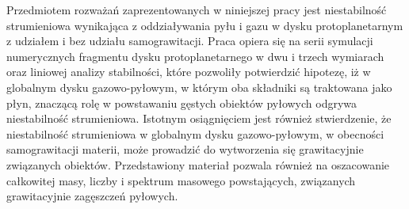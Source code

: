 
Przedmiotem rozważań zaprezentowanych w niniejszej pracy jest niestabilność
strumieniowa wynikająca z oddziaływania pyłu i gazu w dysku protoplanetarnym z
udziałem i bez udziału samograwitacji. Praca opiera się na serii symulacji
numerycznych fragmentu dysku protoplanetarnego w dwu i trzech wymiarach oraz
liniowej analizy stabilności, które pozwoliły potwierdzić hipotezę, iż w
globalnym dysku gazowo-pyłowym, w którym oba składniki są traktowana jako płyn,
znaczącą rolę w powstawaniu gęstych obiektów pyłowych odgrywa niestabilność
strumieniowa. Istotnym osiągnięciem jest również stwierdzenie, że niestabilność
strumieniowa w globalnym dysku gazowo-pyłowym, w obecności samograwitacji
materii, może prowadzić do wytworzenia się grawitacyjnie związanych obiektów.
Przedstawiony materiał pozwala również na oszacowanie całkowitej masy,
liczby i spektrum masowego powstających, związanych grawitacyjnie zagęszczeń
pyłowych.


